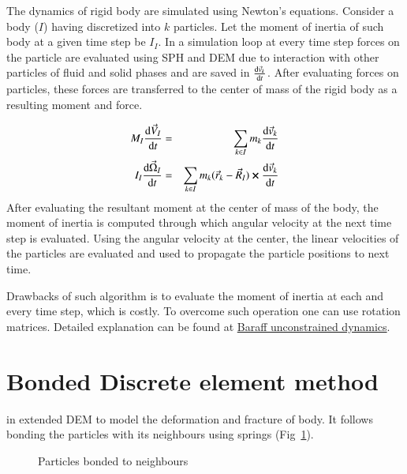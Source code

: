 The dynamics of rigid body are simulated using Newton's equations. Consider a
body ($I$) having discretized into $k$ particles. Let the moment of inertia of
such body at a given time step be $I_I$. In a simulation loop at every time step
forces on the particle are evaluated using SPH and DEM due to interaction with
other particles of fluid and solid phases and are saved in $\dv{\vec{v}_k}{t}$.
After evaluating forces on particles, these forces are transferred to the center
of mass of the rigid body as a resulting moment and force.

\begin{eqnarray}
  \label{eq:rigid_body_newton_equation}
  M_I \dv{\vec{V}_I}{t} &=& \sum_{k \in I} m_k \dv{\vec{v}_k}{t}\\
  I_I \dv{\vec{\Omega}_I}{t} &=& \sum_{k \in I} m_k (\vec{r}_k - \vec{R}_I) \cross \dv{\vec{v}_k}{t}
\end{eqnarray}
After evaluating the resultant moment at the center of mass of the body, the
moment of inertia is computed through which angular velocity at the next time
step is evaluated. Using the angular velocity at the center, the linear
velocities of the particles are evaluated and used to propagate the particle
positions to next time.


Drawbacks of such algorithm is to evaluate the moment of inertia at each and
every time step, which is costly. To overcome such operation one can use
rotation matrices. Detailed explanation can be found at
\href{https://www.cs.cmu.edu/~baraff/sigcourse/notesd1.pdf}{Baraff unconstrained
  dynamics}.

\section{Bonded Discrete element method}
\label{sec:bond-discr-elem}

\citeauthor*{Potyondy_2004} in extended DEM to model the deformation and
fracture of body. It follows bonding the particles with its neighbours using
springs (Fig~\ref{fig:bonded_dem}).


\begin{figure}[htb]
  \centering
  \caption{Particles bonded to neighbours}
  \label{fig:bonded_dem}
\end{figure}

